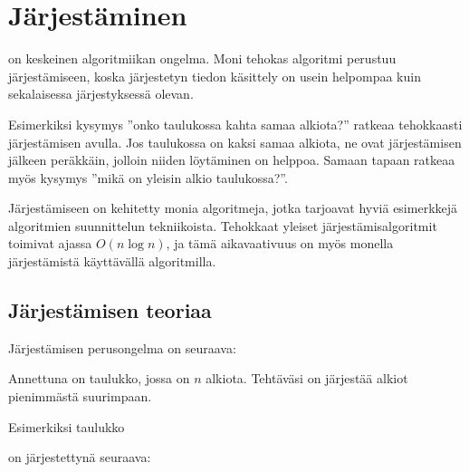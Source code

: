 \chapter{Järjestäminen}


on keskeinen algoritmiikan ongelma.
Moni tehokas algoritmi
perustuu järjestämiseen,
koska järjestetyn tiedon
käsittely on usein helpompaa
kuin sekalaisessa järjestyksessä olevan.

Esimerkiksi kysymys ''onko taulukossa kahta samaa
alkiota?'' ratkeaa tehokkaasti järjestämisen avulla.
Jos taulukossa on kaksi samaa alkiota,
ne ovat järjestämisen jälkeen peräkkäin,
jolloin niiden löytäminen on helppoa.
Samaan tapaan ratkeaa myös kysymys
''mikä on yleisin alkio taulukossa?''.

Järjestämiseen on kehitetty monia
algoritmeja, jotka tarjoavat hyviä
esimerkkejä algoritmien suunnittelun tekniikoista.
Tehokkaat yleiset järjestämis\-algoritmit
toimivat ajassa $O(n \log n)$, ja tämä aikavaativuus
on myös monella järjestämistä käyttävällä algoritmilla.

\section{Järjestämisen teoriaa}

Järjestämisen perusongelma on seuraava:

\begin{task}
Annettuna on taulukko, jossa on $n$ alkiota.
Tehtäväsi on järjestää alkiot pienimmästä
suurimpaan.
\end{task}

\noindent
Esimerkiksi taulukko

\begin{center}
\end{center}

\noindent
on järjestettynä seuraava:

